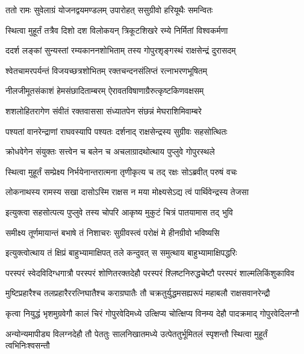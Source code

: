 
\twolineshloka
{ततो रामः सुवेलाग्रं योजनद्वयमण्डलम्}
{उपारोहत् ससुग्रीवो हरियूथैः समन्वितः} %

\twolineshloka
{स्थित्वा मुहूर्तं तत्रैव दिशो दश विलोकयन्}
{त्रिकूटशिखरे रम्ये निर्मितां विश्वकर्मणा} %

\twolineshloka
{ददर्श लङ्कां सुन्यस्तां रम्यकाननशोभिताम्}
{तस्य गोपुरशृङ्गस्थं राक्षसेन्द्रं दुरासदम्} %

\twolineshloka
{श्वेतचामरपर्यन्तं विजयच्छत्रशोभितम्}
{रक्तचन्दनसंलिप्तं रत्नाभरणभूषितम्} %

\twolineshloka
{नीलजीमूतसंकाशं हेमसंछादिताम्बरम्}
{ऐरावतविषाणाग्रैरुत्कृष्टकिणवक्षसम्} %

\twolineshloka
{शशलोहितरागेण संवीतं रक्तवाससा}
{संध्यातपेन संछन्नं मेघराशिमिवाम्बरे} %

\twolineshloka
{पश्यतां वानरेन्द्राणां राघवस्यापि पश्यतः}
{दर्शनाद् राक्षसेन्द्रस्य सुग्रीवः सहसोत्थितः} %

\twolineshloka
{क्रोधवेगेन संयुक्तः सत्त्वेन च बलेन च}
{अचलाग्रादथोत्थाय पुप्लुवे गोपुरस्थले} %

\twolineshloka
{स्थित्वा मुहूर्तं सम्प्रेक्ष्य निर्भयेनान्तरात्मना}
{तृणीकृत्य च तद् रक्षः सोऽब्रवीत् परुषं वचः} %

\twolineshloka
{लोकनाथस्य रामस्य सखा दासोऽस्मि राक्षस}
{न मया मोक्ष्यसेऽद्य त्वं पार्थिवेन्द्रस्य तेजसा} %

\twolineshloka
{इत्युक्त्वा सहसोत्पत्य पुप्लुवे तस्य चोपरि}
{आकृष्य मुकुटं चित्रं पातयामास तद् भुवि} %

\twolineshloka
{समीक्ष्य तूर्णमायान्तं बभाषे तं निशाचरः}
{सुग्रीवस्त्वं परोक्षं मे हीनग्रीवो भविष्यसि} %

\twolineshloka
{इत्युक्त्वोत्थाय तं क्षिप्रं बाहुभ्यामाक्षिपत् तले}
{कन्दुवत् स समुत्थाय बाहुभ्यामाक्षिपद्धरिः} %

\twolineshloka
{परस्परं स्वेदविदिग्धगात्रौ परस्परं शोणितरक्तदेहौ}
{परस्परं श्लिष्टनिरुद्धचेष्टौ परस्परं शाल्मलिकिंशुकाविव} %

\twolineshloka
{मुष्टिप्रहारैश्च तलप्रहारैररत्निघातैश्च कराग्रघातैः}
{तौ चक्रतुर्युद्धमसह्यरूपं महाबलौ राक्षसवानरेन्द्रौ} %

\twolineshloka
{कृत्वा नियुद्धं भृशमुग्रवेगौ कालं चिरं गोपुरवेदिमध्ये}
{उत्क्षिप्य चोत्क्षिप्य विनम्य देहौ पादक्रमाद् गोपुरवेदिलग्नौ} %

\twolineshloka
{अन्योन्यमापीड्य विलग्नदेहौ तौ पेततुः सालनिखातमध्ये}
{उत्पेततुर्भूमितलं स्पृशन्तौ स्थित्वा मुहूर्तं त्वभिनिःश्वसन्तौ} %

